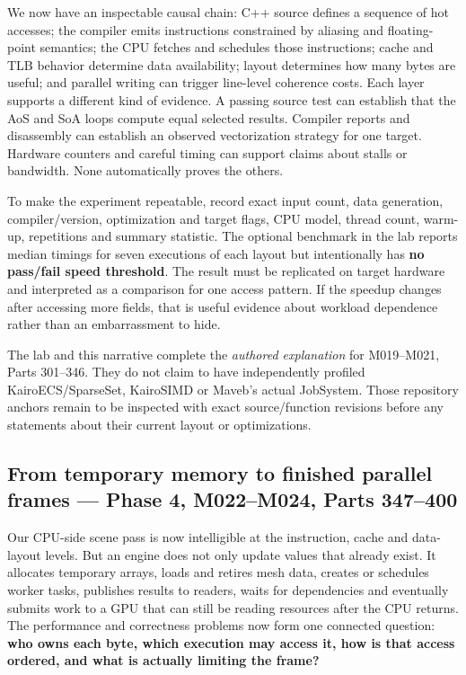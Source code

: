 We now have an inspectable causal chain: C++ source defines a sequence of hot accesses; the compiler emits instructions constrained by aliasing and floating-point semantics; the CPU fetches and schedules those instructions; cache and TLB behavior determine data availability; layout determines how many bytes are useful; and parallel writing can trigger line-level coherence costs. Each layer supports a different kind of evidence. A passing source test can establish that the AoS and SoA loops compute equal selected results. Compiler reports and disassembly can establish an observed vectorization strategy for one target. Hardware counters and careful timing can support claims about stalls or bandwidth. None automatically proves the others.

To make the experiment repeatable, record exact input count, data generation, compiler/version, optimization and target flags, CPU model, thread count, warm-up, repetitions and summary statistic. The optional benchmark in the lab reports median timings for seven executions of each layout but intentionally has \textbf{no pass/fail speed threshold}. The result must be replicated on target hardware and interpreted as a comparison for one access pattern. If the speedup changes after accessing more fields, that is useful evidence about workload dependence rather than an embarrassment to hide.

The lab and this narrative complete the \emph{authored explanation} for M019--M021, Parts 301--346. They do not claim to have independently profiled KairoECS/SparseSet, KairoSIMD or Maveb's actual JobSystem. Those repository anchors remain to be inspected with exact source/function revisions before any statements about their current layout or optimizations.

\subsection{From temporary memory to finished parallel frames --- Phase 4, M022--M024, Parts 347--400}\label{from-temporary-memory-to-finished-parallel-frames-phase-4-m022m024-parts-347400}

Our CPU-side scene pass is now intelligible at the instruction, cache and data-layout levels. But an engine does not only update values that already exist. It allocates temporary arrays, loads and retires mesh data, creates or schedules worker tasks, publishes results to readers, waits for dependencies and eventually submits work to a GPU that can still be reading resources after the CPU returns. The performance and correctness problems now form one connected question: \textbf{who owns each byte, which execution may access it, how is that access ordered, and what is actually limiting the frame?}

